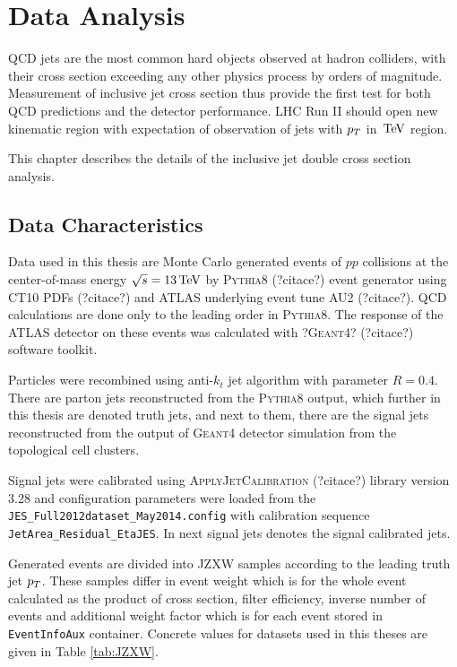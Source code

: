 \chapter{Data Analysis}


QCD jets are the most common hard objects observed at hadron colliders, with
their cross section exceeding any other physics process by orders of magnitude.
Measurement of inclusive jet cross section thus provide the first test for both
QCD predictions and the detector performance. LHC Run II should open new
kinematic region with expectation of observation of jets with $p_{T}$ in $\,\text{TeV}$
region.

This chapter describes the details of the inclusive jet double cross section
analysis.

\section{Data Characteristics}

Data used in this thesis are Monte Carlo generated events of $pp$ collisions at
the center-of-mass energy $\sqrt{s} = 13\,\text{TeV}$ by \textsc{Pythia8}
(?citace?) event generator using CT10 PDFs (?citace?) and ATLAS underlying event
tune AU2 (?citace?). QCD calculations are done only to the leading order in
\textsc{Pythia8}. The response of the ATLAS detector on these events was
calculated with ?\textsc{Geant4}? (?citace?) software toolkit.

Particles were recombined using anti-$k_t$ jet algorithm with parameter $R=0.4$.
There are parton jets reconstructed from the \textsc{Pythia8} output, which
further in this thesis are denoted truth jets, and next to them, there are the
signal jets reconstructed from the output of \textsc{Geant4} detector
simulation from the topological cell clusters. 

Signal jets were calibrated using \textsc{ApplyJetCalibration} (?citace?)
library version 3.28 and configuration parameters were loaded from the
\texttt{JES\_Full2012dataset\_May2014.config} with calibration sequence
\texttt{JetArea\_Residual\_EtaJES}. In next signal jets denotes the signal
calibrated jets.

Generated events are divided into JZXW samples according to
the leading truth jet $p_{T}$. These samples differ in event weight which is for
the whole event calculated as the product of cross section, filter efficiency,
inverse number of events and additional weight factor which is for each event
stored in \texttt{EventInfoAux} container. Concrete values for datasets used in
this theses are given in Table \ref{tab:JZXW}.  

